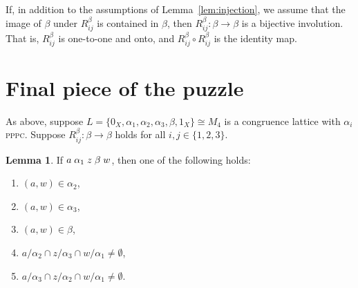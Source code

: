 \documentclass{amsart}
\theoremstyle{plain}
\theoremstyle{definition}
\newtheorem{lemma}{Lemma}
\theoremstyle{definition}
\numberwithin{equation}{section}
\newcommand{\<}{\ensuremath{\langle}}
\renewcommand{\>}{\ensuremath{\rangle}}
\renewcommand{\leq}{\ensuremath{\leqslant}}
\newcommand{\rel}{\ensuremath{\mathrel}}
\newcommand{\PPPC}{\textsc{pppc}\xspace}
\begin{document}
If, in addition to the assumptions  of Lemma~\ref{lem:injection}, we assume that
the image of $\beta$ under $R_{ij}^\beta$ is contained in $\beta$, then 
$R_{ij}^\beta: \beta \rightarrow \beta$ is a bijective involution.
That is, $R_{ij}^\beta$ is one-to-one and onto, and 
$R_{ij}^\beta\circ R_{ij}^\beta$ is the identity map.


\section{Final piece of the puzzle}
As above, suppose $L = \{0_X, \alpha_1, \alpha_2, \alpha_3, \beta, 1_X\} \cong  M_4$ is a
congruence lattice with $\alpha_i$ \PPPC.  
Suppose $R_{ij}^\beta: \beta \rightarrow \beta$ holds for all 
$i, j \in \{1,2,3\}$.

\begin{lemma}
  \label{lem:missingpiece}
If %
$a \rel{\alpha_1} z \rel{\beta} w$,
then one of the following holds:
\begin{enumerate}
\item $(a,w) \in \alpha_2$, 
\item $(a,w) \in \alpha_3$, 
\item $(a,w) \in \beta$, 
\item $a/\alpha_2 \cap z/\alpha_3 \cap w/\alpha_1 \neq \emptyset$,
\item $a/\alpha_3 \cap z/\alpha_2 \cap w/\alpha_1 \neq \emptyset$.
\end{enumerate}
\end{lemma}
\end{document}
